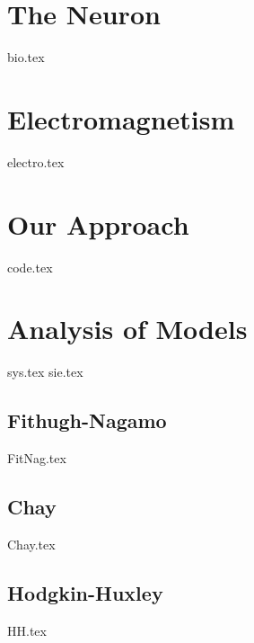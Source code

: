
\chapter{The Neuron}\label{ch:neuron}
{bio.tex}

\chapter{Electromagnetism}\label{ch:elemag}
{electro.tex}

\chapter{Our Approach}\label{ch:approa}
{code.tex}

\chapter{Analysis of Models}\label{ch:matmod}
{sys.tex}
{sie.tex}

\section{Fithugh-Nagamo}
{FitNag.tex}

\newpage
\section{Chay}
{Chay.tex}

\newpage
\section{Hodgkin-Huxley}
{HH.tex}


